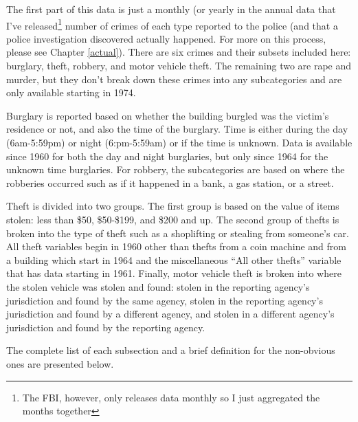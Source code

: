 \documentclass[
  12pt,
  openany]{book}
\begin{document}
The first part of this data is just a monthly (or yearly in the annual data that I've released\footnote{The FBI, however, only releases data monthly so I just aggregated the months together} number of crimes of each type reported to the police (and that a police investigation discovered actually happened. For more on this process, please see Chapter \ref{actual}). There are six crimes and their subsets included here: burglary, theft, robbery, and motor vehicle theft. The remaining two are rape and murder, but they don't break down these crimes into any subcategories and are only available starting in 1974.

Burglary is reported based on whether the building burgled was the victim's residence or not, and also the time of the burglary. Time is either during the day (6am-5:59pm) or night (6:pm-5:59am) or if the time is unknown. Data is available since 1960 for both the day and night burglaries, but only since 1964 for the unknown time burglaries. For robbery, the subcategories are based on where the robberies occurred such as if it happened in a bank, a gas station, or a street.

Theft is divided into two groups. The first group is based on the value of items stolen: less than \$50, \$50-\$199, and \$200 and up. The second group of thefts is broken into the type of theft such as a shoplifting or stealing from someone's car. All theft variables begin in 1960 other than thefts from a coin machine and from a building which start in 1964 and the miscellaneous ``All other thefts'' variable that has data starting in 1961. Finally, motor vehicle theft is broken into where the stolen vehicle was stolen and found: stolen in the reporting agency's jurisdiction and found by the same agency, stolen in the reporting agency's jurisdiction and found by a different agency, and stolen in a different agency's jurisdiction and found by the reporting agency.

The complete list of each subsection and a brief definition for the non-obvious ones are presented below.
\end{document}
